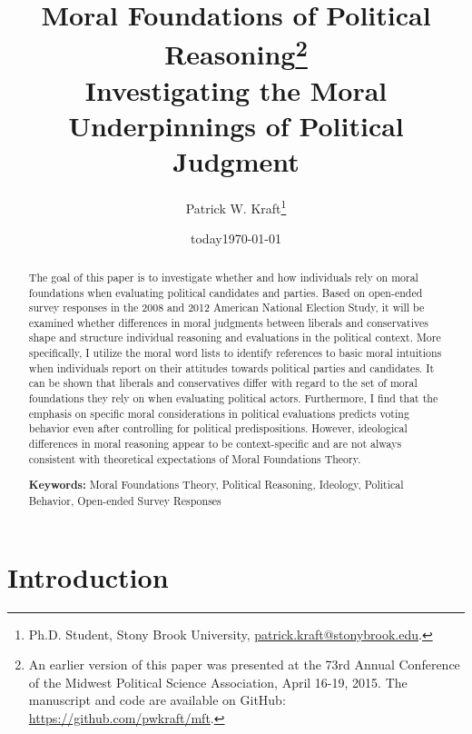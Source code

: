\documentclass[12pt]{article}
\author{Patrick W. Kraft\footnote{Ph.D. Student, Stony Brook University, \href{mailto:patrick.kraft@stonybrook.edu}{patrick.kraft@stonybrook.edu}.
}}
\date{today}
\title{Moral Foundations of Political Reasoning\footnote{An earlier version of this paper was presented at the 73rd Annual Conference of the Midwest Political Science Association, April 16-19, 2015. The manuscript and code are available on GitHub: \url{https://github.com/pwkraft/mft}.}\\
\large{Investigating the Moral Underpinnings of Political Judgment}}
\date{\today}
\begin{document}
\maketitle
\onehalfspacing

\begin{abstract}
The goal of this paper is to investigate whether and how individuals rely on moral foundations when evaluating political candidates and parties. Based on open-ended survey responses in the 2008 and 2012 American National Election Study, it will be examined whether differences in moral judgments between liberals and conservatives shape and structure individual reasoning and evaluations in the political context. More specifically, I utilize the moral word lists to identify references to basic moral intuitions when individuals report on their attitudes towards political parties and candidates. It can be shown that liberals and conservatives differ with regard to the set of moral foundations they rely on when evaluating political actors. Furthermore, I find that the emphasis on specific moral considerations in political evaluations predicts voting behavior even after controlling for political predispositions. However, ideological differences in moral reasoning appear to be context-specific and are not always consistent with theoretical expectations of Moral Foundations Theory.

\vspace{\baselineskip}
\noindent \textbf{Keywords:} Moral Foundations Theory, Political Reasoning, Ideology, Political Behavior, Open-ended Survey Responses
\end{abstract}
\newpage

\section{Introduction}


\end{document}
